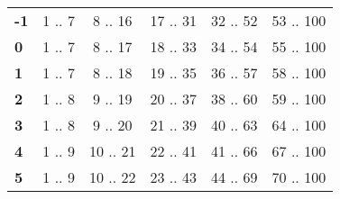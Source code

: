 \documentclass[oneside]{book}
\begin{document}
\begin{table}[h]
\begin{tabular}{lccccc}
\rowcolor[HTML]{EFEFEF} 
\textbf{-1}                                & {\color[HTML]{333333} 1 .. 7}                             & 8 .. 16                            & 17 .. 31                                               & 32 .. 52                                               & 53 .. 100                                              \\
\rowcolor[HTML]{FFFFFF} 
\textbf{0}                                 & {\color[HTML]{333333} 1 .. 7}                             & 8 .. 17                            & 18 .. 33                                               & 34 .. 54                                               & 55 .. 100                                              \\
\rowcolor[HTML]{EFEFEF} 
\textbf{1}                                 & {\color[HTML]{333333} 1 .. 7}                             & 8 .. 18                            & 19 .. 35                                               & 36 .. 57                                               & 58 .. 100                                              \\
\rowcolor[HTML]{FFFFFF} 
\textbf{2}                                 & {\color[HTML]{333333} 1 .. 8}                             & 9 .. 19                            & 20 .. 37                                               & 38 .. 60                                               & 59 .. 100                                              \\
\rowcolor[HTML]{EFEFEF} 
\textbf{3}                                 & {\color[HTML]{333333} 1 .. 8}                             & 9 .. 20                            & 21 .. 39                                               & 40 .. 63                                               & 64 .. 100                                              \\
\rowcolor[HTML]{FFFFFF} 
\textbf{4}                                 & {\color[HTML]{333333} 1 .. 9}                             & 10 .. 21                           & 22 .. 41                                               & 41 .. 66                                               & 67 .. 100                                              \\
\rowcolor[HTML]{EFEFEF} 
\textbf{5}                                 & {\color[HTML]{333333} 1 .. 9}                             & 10 .. 22                           & 23 .. 43                                               & 44 .. 69                                               & 70 .. 100                                              \\

\end{tabular}
\end{table}
\end{document}
